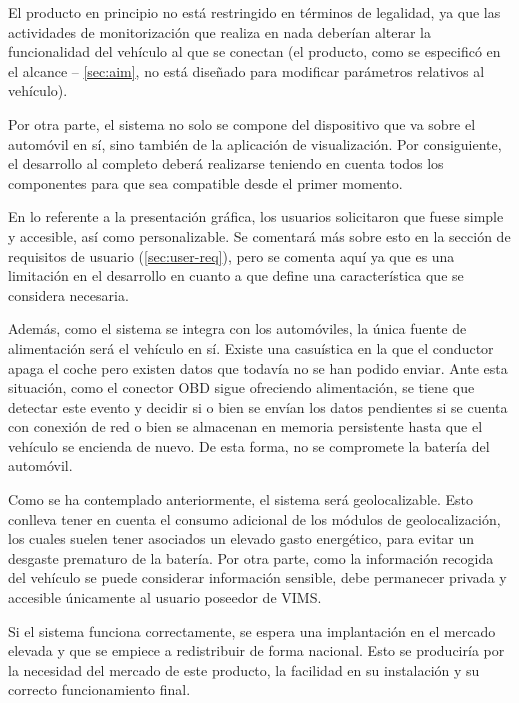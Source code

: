 El producto en principio no está restringido en términos de legalidad, ya que las
actividades de monitorización que realiza en nada deberían
alterar la funcionalidad del vehículo al que se conectan 
(el producto, como se especificó en el alcance
-- \ref{sec:aim}, no está diseñado para modificar parámetros relativos al
vehículo).

Por otra parte, el sistema no solo se compone del dispositivo que va sobre el
automóvil en sí, sino también de la aplicación de visualización. Por
consiguiente, el desarrollo al completo deberá realizarse teniendo en cuenta
todos los componentes para que sea compatible desde el primer momento.

En lo referente a la presentación gráfica, los usuarios solicitaron que fuese
simple y accesible, así como personalizable. Se comentará más sobre esto en la
sección de requisitos de usuario (\ref{sec:user-req}), pero se comenta aquí ya
que es una limitación en el desarrollo en cuanto a que define una característica
que se considera necesaria.

Además, como el sistema se integra con los automóviles, la única fuente de
alimentación será el vehículo en sí. Existe una casuística en la que el conductor apaga el
coche pero existen datos que todavía no se han podido enviar. Ante esta situación,
como el conector \ac{OBD} sigue ofreciendo alimentación, se tiene que detectar este
evento y decidir si o bien se envían los datos pendientes si se cuenta con conexión de red o
bien se almacenan en memoria persistente hasta que el vehículo se encienda de
nuevo. De esta forma, no se compromete la batería del automóvil.

Como se ha contemplado anteriormente, el sistema será geolocalizable. Esto
conlleva tener en cuenta el consumo adicional de los módulos de geolocalización,
los cuales suelen tener asociados un elevado gasto energético, para evitar
un desgaste prematuro de la batería. Por otra parte, como la información recogida
del vehículo se puede considerar información sensible, debe permanecer privada y 
accesible únicamente al usuario poseedor de \ac{VIMS}.

Si el sistema funciona correctamente, se espera una implantación en el mercado
elevada y que se empiece a redistribuir de forma nacional. Esto se produciría
por la necesidad del mercado de este producto, la facilidad en su instalación y
su correcto funcionamiento final.